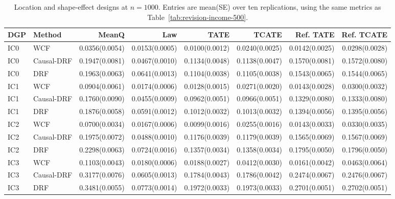 \begin{table}[t]
\centering
\scriptsize
\setlength{\tabcolsep}{3pt}
\caption{Location and shape-effect designs at $n=1000$. Entries are mean(SE) over ten replications, using the same metrics as Table~\ref{tab:revision-income-500}.}
\label{tab:revision-income-1000}
\begin{tabular}{llrrrrrr}
\toprule
DGP & Method & MeanQ & Law & TATE & TCATE & Ref. TATE & Ref. TCATE \\
\midrule
IC0 & WCF & 0.0356(0.0054) & 0.0153(0.0005) & 0.0100(0.0012) & 0.0240(0.0025) & 0.0142(0.0025) & 0.0298(0.0028) \\
IC0 & Causal-DRF & 0.1947(0.0081) & 0.0467(0.0010) & 0.1134(0.0048) & 0.1138(0.0047) & 0.1570(0.0081) & 0.1572(0.0080) \\
IC0 & DRF & 0.1963(0.0063) & 0.0641(0.0013) & 0.1104(0.0038) & 0.1105(0.0038) & 0.1543(0.0065) & 0.1544(0.0065) \\
IC1 & WCF & 0.0904(0.0061) & 0.0174(0.0006) & 0.0128(0.0015) & 0.0271(0.0020) & 0.0143(0.0028) & 0.0300(0.0032) \\
IC1 & Causal-DRF & 0.1760(0.0090) & 0.0455(0.0009) & 0.0962(0.0051) & 0.0966(0.0051) & 0.1329(0.0080) & 0.1333(0.0080) \\
IC1 & DRF & 0.1876(0.0058) & 0.0591(0.0012) & 0.1012(0.0032) & 0.1013(0.0032) & 0.1394(0.0056) & 0.1395(0.0056) \\
IC2 & WCF & 0.0700(0.0034) & 0.0167(0.0006) & 0.0099(0.0016) & 0.0255(0.0016) & 0.0143(0.0033) & 0.0330(0.0035) \\
IC2 & Causal-DRF & 0.1975(0.0072) & 0.0488(0.0010) & 0.1176(0.0039) & 0.1179(0.0039) & 0.1565(0.0069) & 0.1567(0.0069) \\
IC2 & DRF & 0.2298(0.0063) & 0.0724(0.0016) & 0.1357(0.0034) & 0.1358(0.0034) & 0.1795(0.0050) & 0.1796(0.0050) \\
IC3 & WCF & 0.1103(0.0043) & 0.0180(0.0006) & 0.0188(0.0027) & 0.0412(0.0030) & 0.0161(0.0042) & 0.0463(0.0064) \\
IC3 & Causal-DRF & 0.3177(0.0076) & 0.0605(0.0013) & 0.1784(0.0043) & 0.1786(0.0042) & 0.2474(0.0067) & 0.2476(0.0067) \\
IC3 & DRF & 0.3481(0.0055) & 0.0773(0.0014) & 0.1972(0.0033) & 0.1973(0.0033) & 0.2701(0.0051) & 0.2702(0.0051) \\
\bottomrule
\end{tabular}
\end{table}
